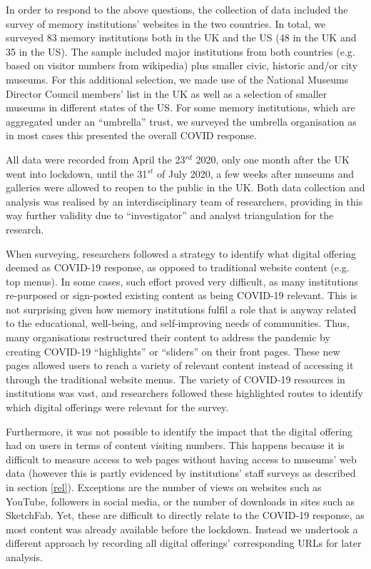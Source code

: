 \documentclass{egpubl}
\begin{document}
In order to respond to the above questions, the collection of data included the survey of memory institutions' websites in the two countries. In total, we surveyed 83 memory institutions both in the UK and the US (48 in the  UK and 35 in the US). The sample included major institutions from both countries (e.g. based on visitor numbers from wikipedia) \cite{Wikipedia} plus smaller civic, historic and/or city museums. For this additional selection, we made use of the National Museums Director Council members' list in the UK \cite{nationalmuseums:2020} as well as a selection of smaller museums in different states of the US. For some memory institutions, which are aggregated under an ``umbrella'' trust, we surveyed the umbrella organisation as in most cases this presented the overall COVID response.

All data were recorded from April the 23$^{rd}$  2020, only one month after the UK went into lockdown, until the 31$^{st}$ of July 2020, a few weeks after museums and galleries were allowed to reopen to the public in the UK. Both data collection and analysis was realised by an interdisciplinary team of researchers, providing in this way further validity due to ``investigator'' and analyst triangulation for the research.


When surveying, researchers followed a strategy to identify what digital offering deemed as COVID-19 response, as opposed to traditional website content (e.g. top menus). In some cases, such effort proved very difficult, as many institutions re-purposed or sign-posted existing content as being COVID-19 relevant. This is not surprising given how memory institutions fulfil a role that is anyway related to the educational, well-being, and self-improving needs of communities. Thus, many organisations restructured their content to address the pandemic by creating COVID-19 ``highlights'' or ``sliders'' on their front pages. These new pages allowed users to reach a variety of relevant content instead of accessing it through the traditional website menus. The variety of COVID-19 resources in institutions was vast, and researchers followed these highlighted routes to identify which digital offerings were relevant for the survey. 

Furthermore, it was not possible to identify the impact that the digital offering had on users in terms of content visiting numbers. This happens because it is difficult to measure access to web pages without having access to museums’ web data (however this is partly evidenced by institutions' staff surveys as described in section \ref{rel}). Exceptions are the number of views on websites such as YouTube, followers in social media, or the number of downloads in sites such as SketchFab. Yet, these are difficult to directly relate to the COVID-19 response, as most content was already available before the lockdown. Instead we undertook a different approach by recording all digital offerings' corresponding URLs for later analysis. 
\end{document}
